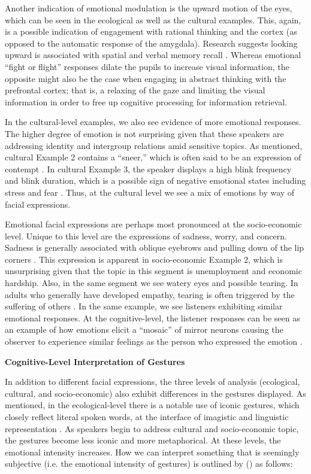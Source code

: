 Another indication of emotional modulation is the upward motion of the eyes, which can be seen in the ecological as well as the cultural examples. This, again, is a possible indication of engagement with rational thinking and the cortex (as opposed to the automatic response of the amygdala). Research suggests looking upward is associated with spatial and verbal memory recall \citep{Nespoulous2014}. Whereas emotional ``fight or flight'' responses dilate the pupils to increase visual information, the opposite might also be the case when engaging in abstract thinking with the prefrontal cortex; that is, a relaxing of the gaze and limiting the visual information in order to free up cognitive processing for information retrieval.

In the cultural-level examples, we also see evidence of more emotional responses. The higher degree of emotion is not surprising given that these speakers are addressing identity and intergroup relations amid sensitive topics. As mentioned, cultural Example 2 contains a ``sneer,'' which is often said to be an expression of contempt \citep{Izard1988}. In cultural Example 3, the speaker displays a high blink frequency and blink duration, which is a possible sign of negative emotional states including stress \citep{Haak2019} and fear \citep{Maffei2019}. Thus, at the cultural level we see a mix of emotions by way of facial expressions.

Emotional facial expressions are perhaps most pronounced at the socio-economic level. Unique to this level are the expressions of sadness, worry, and concern. Sadness is generally associated with oblique eyebrows and pulling down of the lip corners \citep{Duran2017}. This expression is apparent in socio-economic Example 2, which is unsurprising given that the topic in this segment is unemployment and economic hardship. Also, in the same segment we see watery eyes and possible tearing. In adults who generally have developed empathy, tearing is often triggered by the suffering of others \citep{Murube1999}. In the same example, we see listeners exhibiting similar emotional responses. At the cognitive-level, the listener responses can be seen as an example of how emotions elicit a ``mosaic'' of mirror neurons causing the observer to experience similar feelings as the person who expressed the emotion \citep{Bastiaansen2009}. 

\textbf{Cognitive-Level Interpretation of Gestures}

In addition to different facial expressions, the three levels of analysis (ecological, cultural, and socio-economic) also exhibit differences in the gestures displayed. As mentioned, in the ecological-level there is a notable use of iconic gestures, which closely reflect literal spoken words, at the interface of imagistic and linguistic representation \citep{Ozyurek2010}. As speakers begin to address cultural and socio-economic topic, the gestures become less iconic and more metaphorical. At these levels, the emotional intensity increases. How we can interpret something that is seemingly subjective (i.e. the emotional intensity of gestures) is outlined by \citeauthor{Kinsbourne2006} (\citeyear{Kinsbourne2006}) as follows: 

